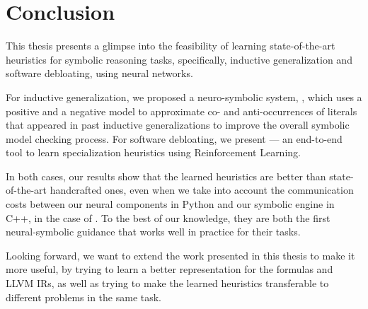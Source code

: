 \chapter{Conclusion}
\label{chap:conclusion}
This thesis presents a glimpse into the feasibility of learning state-of-the-art heuristics for symbolic reasoning tasks, specifically, inductive generalization and software debloating, using neural networks.

For inductive generalization, we proposed a neuro-symbolic system, \dpy, which uses a positive and a negative model to approximate co- and anti-occurrences of literals that appeared in past inductive generalizations to improve the overall symbolic model checking process.
For software debloating, we present \doccam --- an end-to-end tool to learn
specialization heuristics using Reinforcement Learning.

In both cases, our results show that the learned heuristics are better than state-of-the-art handcrafted ones, even when we take into account the communication costs between our neural components in Python and our symbolic engine in C++, in the case of \dpy. To the best of our knowledge, they are both the first neural-symbolic guidance that works well in practice for their tasks.

Looking forward, we want to extend the work presented in this thesis to make it more useful, by trying to learn a better representation for the formulas and LLVM IRs, as well as trying to make the learned heuristics transferable to different problems in the same task. 

